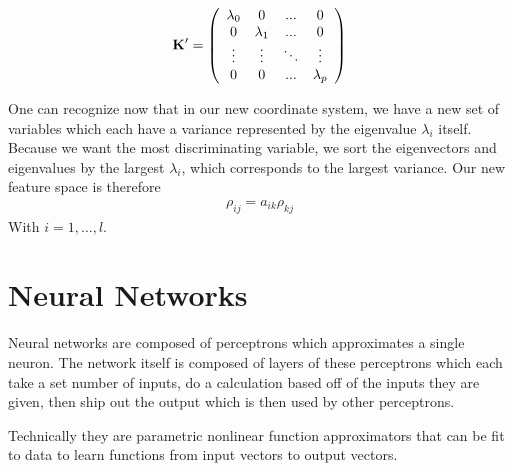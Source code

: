 $$\bf{K}' = \left(
{\begin{array}{cccc}
\lambda_0 & 0 &...&0 \\
0 & \lambda_1 & ...&0\\
\vdots & \vdots &\ddots & \vdots \\
0 & 0 & ... &\lambda_p
\end{array}}
\right)
$$

One can recognize now that in our new coordinate system, we have a new set of variables which each have a variance represented by the eigenvalue $\lambda_i$ itself. Because we want the most discriminating variable, we sort the eigenvectors and eigenvalues by the largest $\lambda_i$, which corresponds to the largest variance. Our new feature space is therefore
\begin{align}
	\rho_{ij} = a_{ik}\rho_{kj}
\end{align}
With $i=1,\dots,l$.


\section{Neural Networks}
Neural networks are composed of perceptrons which approximates a single neuron. The network itself is composed of layers of these perceptrons which each take a set number of inputs, do a calculation based off of the inputs they are given, then ship out the output which is then used by other perceptrons.

Technically they are parametric nonlinear function approximators that can be fit to data to learn functions from input vectors to output vectors.

